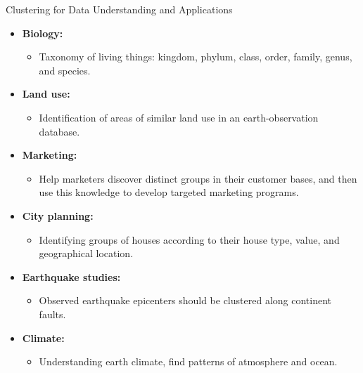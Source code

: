 \begin{frame}{Clustering for Data Understanding and Applications}
	\begin{itemize}
		\item \textbf{Biology:}
		      \begin{itemize}
			      \item Taxonomy of living things: kingdom, phylum, class, order,
			            family, genus, and species.
		      \end{itemize}
		\item \textbf{Land use:}
		      \begin{itemize}
			      \item Identification of areas of similar land use in an
			            earth-observation database.
		      \end{itemize}
		\item \textbf{Marketing:}
		      \begin{itemize}
			      \item Help marketers discover distinct groups in their customer
			            bases, and then use this knowledge to develop targeted marketing
			            programs.
		      \end{itemize}
		\item \textbf{City planning:}
		      \begin{itemize}
			      \item Identifying groups of houses according to their house type,
			            value, and geographical location.
		      \end{itemize}
		\item \textbf{Earthquake studies:}
		      \begin{itemize}
			      \item Observed earthquake epicenters should be clustered along
			            continent faults.
		      \end{itemize}
		\item \textbf{Climate:}
		      \begin{itemize}
			      \item Understanding earth climate, find patterns of atmosphere and
			            ocean.
		      \end{itemize}
	\end{itemize}
\end{frame}

